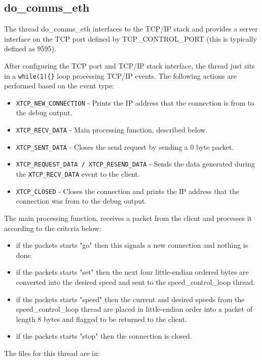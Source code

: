\subsection{do\_comms\_eth}

The thread do\_comms\_eth interfaces to the TCP/IP stack and provides a server interface on the TCP port defined by TCP\_CONTROL\_PORT (this is typically defined as 9595).

After configuring the TCP port and TCP/IP stack interface, the thread just sits in a \verb!while(1){}! loop processing TCP/IP events. 
The following actions are performed based on the event type:

\begin{itemize}
\item \verb!XTCP_NEW_CONNECTION! - Prints the IP address that the connection is from to the debug output.
\item \verb!XTCP_RECV_DATA! - Main processing function, described below.
\item \verb!XTCP_SENT_DATA! - Closes the send request by sending a 0 byte packet.
\item \verb!XTCP_REQUEST_DATA / XTCP_RESEND_DATA! - Sends the data generated during the \verb!XTCP_RECV_DATA! event to the client.
\item \verb!XTCP_CLOSED! - Closes the connection and prints the IP address that the connection was from to the debug output.
\end{itemize}

The main processing function, receives a packet from the client and processes it according to the criteria below: 

\begin{itemize}
\item if the packets starts "go" then this signals a new connection and nothing is done.
\item if the packets starts "set" then the next four little-endian ordered bytes are converted into the desired speed and sent to the speed\_control\_loop thread.
\item if the packets starts "speed" then the current and desired speeds from the speed\_control\_loop thread are placed in little-endian order into a packet of length 8 bytes and flagged to be returned to the client.
\item if the packets starts "stop" then the connection is closed.
\end{itemize}

The files for this thread are in:

